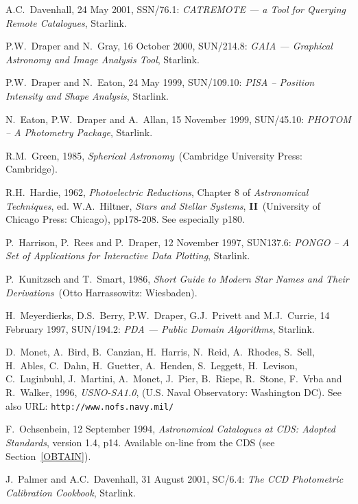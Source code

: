 \documentclass[twoside,11pt]{article}
\newcommand{\htmladdnormallink}[2]{#1}
\newcommand{\xref}[3]{#1}
\renewcommand{\_}{\texttt{\symbol{95}}}
\begin{document}
\begin{thebibliography}{99}
   A.C.~Davenhall, 24 May 2001,
   \xref{SSN/76.1}{ssn76}{}: {\it CATREMOTE --- a Tool for Querying Remote
   Catalogues}, Starlink.

   P.W.~Draper and N.~Gray, 16 October 2000,
   \xref{SUN/214.8}{sun214}{}: {\it GAIA --- Graphical Astronomy and
   Image Analysis Tool}, Starlink.

   P.W.~Draper and N.~Eaton, 24 May 1999,
   \xref{SUN/109.10}{sun109}{}: {\it PISA -- Position Intensity and Shape
   Analysis}, Starlink.

   N.~Eaton, P.W.~Draper and A.~Allan, 15 November 1999,
   \xref{SUN/45.10}{sun45}{}: {\it PHOTOM -- A Photometry Package},
   Starlink.

   R.M.~Green, 1985, {\it Spherical Astronomy}\,
   (Cambridge University Press: Cambridge).

   R.H.~Hardie, 1962, {\it Photoelectric Reductions},
   Chapter 8 of {\it Astronomical Techniques}, ed. W.A.~Hiltner, {\it
   Stars and Stellar Systems}, {\bf II}\, (University of Chicago Press:
   Chicago), pp178-208.  See especially p180.

   P.~Harrison, P.~Rees and P.~Draper, 12 November 1997,
   \xref{SUN137.6}{sun137}{}: {\it PONGO -- A Set of Applications for
   Interactive Data Plotting}, Starlink.

   P.~Kunitzsch and T.~Smart, 1986, {\it Short Guide to
   Modern Star Names and Their Derivations}\, (Otto Harrassowitz:
   Wiesbaden).

   H.~Meyerdierks, D.S.~Berry, P.W.~Draper, G.J.~Privett
   and M.J.~Currie, 14 February 1997, \xref{SUN/194.2}{sun194}{}: {\it PDA
   --- Public Domain Algorithms}, Starlink.

   D.~Monet, A.~Bird, B.~Canzian, H.~Harris, N.~Reid,
   A.~Rhodes, S.~Sell, H.~Ables, C.~Dahn, H.~Guetter, A.~Henden,
   S.~Leggett, H.~Levison, C.~Luginbuhl, J.~Martini, A.~Monet, J.~Pier, 
   B.~Riepe, R.~Stone, F.~Vrba and R.~Walker,
   1996, {\it USNO-SA1.0}, (U.S. Naval Observatory: Washington DC). 
   See also URL: \htmladdnormallink{
   {\tt http://www.nofs.navy.mil/}}{http://www.nofs.navy.mil/}

   F.~Ochsenbein, 12 September 1994, {\it
   Astronomical Catalogues at CDS: Adopted Standards}, version 1.4, p14.
   Available on-line from the CDS (see Section~\ref{OBTAIN}).

   J.~Palmer and A.C.~Davenhall, 31 August 2001,
   \xref{SC/6.4}{sc6}{}: {\it The CCD Photometric Calibration Cookbook},
   Starlink.


\end{thebibliography}
\end{document}
